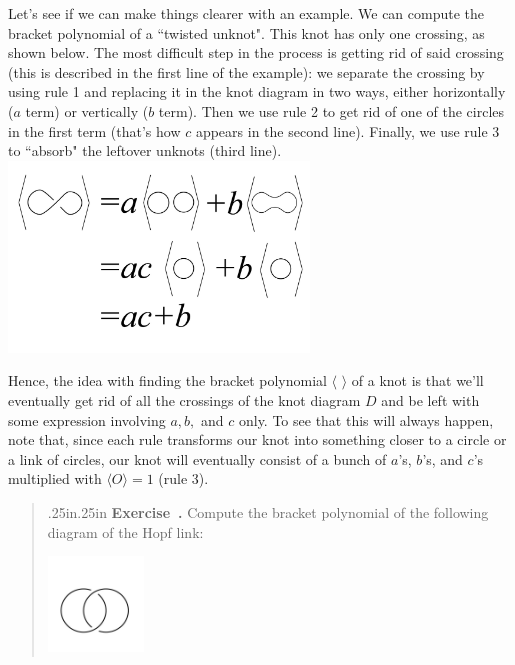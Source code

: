 \documentclass[12 pt]{article}
\newcounter{exercise}[section]
\newenvironment{exercise}{\refstepcounter{exercise}\par\bigskip \begin{quotation}{}{\leftmargin .25in\rightmargin .25in}
	\noindent \textbf{Exercise~\thesection.\theexercise }  \rmfamily}{\end{quotation}\par\bigskip}
\begin{document}
Let's see if we can make things clearer with an example. We can compute the bracket polynomial of a ``twisted unknot". This knot has only one crossing, as shown below. The most difficult step in the process is getting rid of said crossing (this is described in the first line of the example): we separate the crossing by using rule 1 and replacing it in the knot diagram in two ways, either horizontally ($a$ term) or vertically ($b$ term). Then we use rule 2 to get rid of one of the circles in the first term (that's how $c$ appears in the second line). Finally, we use rule 3 to ``absorb" the leftover unknots (third line).
\\
\includegraphics[height = 2in]{unknot_bracket_comp.jpg}

Hence, the idea with finding the bracket polynomial $\langle\,\,\rangle$ of a knot is that we'll eventually get rid of all the crossings of the knot diagram $D$ and be left with some expression involving $a,b,$ and $c$ only. To see that this will always happen, note that, since each rule transforms our knot into something closer to a circle or a link of circles, our knot will eventually consist of a bunch of $a$'s, $b$'s, and $c$'s multiplied with $\langle O\rangle = 1$ (rule 3). 

\begin{exercise}
Compute the bracket polynomial of the following diagram of the Hopf link:
\begin{center}
\includegraphics[height=1in]{hopf_link.jpg}
\end{center}
\end{exercise}
\end{document}
